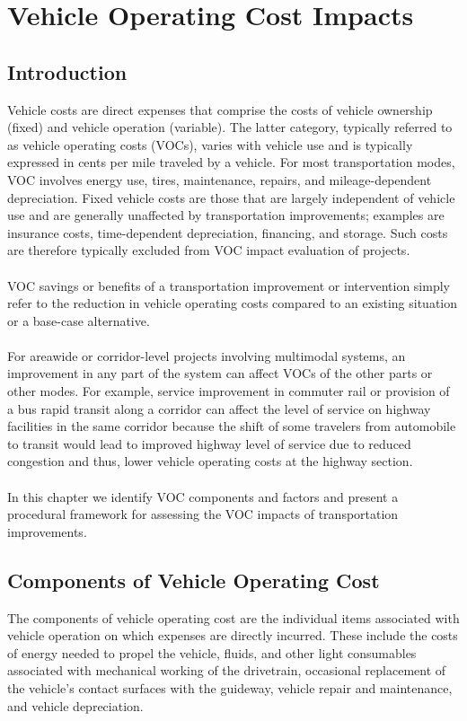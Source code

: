 \chapter{Vehicle Operating Cost Impacts}
\section{Introduction}
Vehicle costs are direct expenses that comprise the costs of vehicle ownership (fixed) and vehicle operation (variable). The latter category, typically referred to as vehicle operating costs (VOCs), varies with vehicle use and is typically expressed in cents per mile traveled by a vehicle. For most transportation modes, VOC involves energy use, tires, maintenance, repairs, and mileage-dependent depreciation. Fixed vehicle costs are those that are largely independent of vehicle use and are generally unaffected by transportation improvements; examples are insurance costs, time-dependent depreciation, financing, and storage. Such costs are therefore typically excluded from VOC impact evaluation of projects.\\\\
VOC savings or benefits of a transportation improvement or intervention simply refer to the reduction in vehicle operating costs compared to an existing situation or a base-case alternative.\\\\
For areawide or corridor-level projects involving multimodal systems, an improvement in any part of the system can affect VOCs of the other parts or other modes. For example, service improvement in commuter rail or provision of a bus rapid transit along a corridor can affect the level of service on highway facilities in the same corridor because the shift of some travelers from automobile to transit would lead to improved highway level of service due to reduced congestion and thus, lower vehicle operating costs at the highway section.\\\\
In this chapter we identify VOC components and factors and present a procedural framework for assessing the
VOC impacts of transportation improvements.
\section{Components of Vehicle Operating Cost}
The components of vehicle operating cost are the individual items associated with vehicle operation on which expenses are directly incurred. These include the costs of energy needed to propel the vehicle, fluids, and other light consumables associated with mechanical working of the drivetrain, occasional replacement of the vehicle’s contact surfaces with the guideway, vehicle repair and maintenance, and vehicle depreciation.
